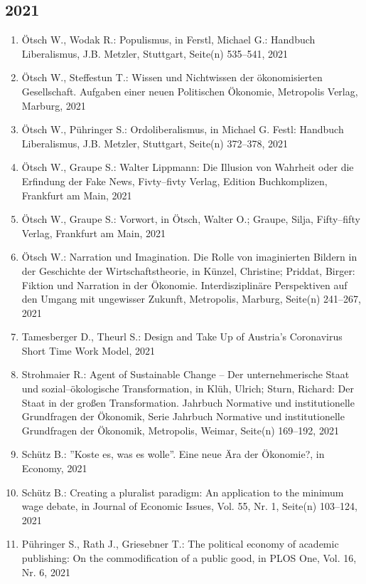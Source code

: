\subsection*{2021}
\begin{enumerate}
    	 \item Ötsch W., Wodak R.: Populismus, in Ferstl, Michael G.: Handbuch Liberalismus, J.B. Metzler, Stuttgart, Seite(n) 535--541, 2021
	 \item Ötsch W., Steffestun T.: Wissen und Nichtwissen der ökonomisierten Gesellschaft. Aufgaben einer neuen Politischen Ökonomie, Metropolis Verlag, Marburg, 2021
	 \item Ötsch W., Pühringer S.: Ordoliberalismus, in Michael G. Festl: Handbuch Liberalismus, J.B. Metzler, Stuttgart, Seite(n) 372--378, 2021
	 \item Ötsch W., Graupe S.: Walter Lippmann: Die Illusion von Wahrheit oder die Erfindung der Fake News, Fivty--fivty Verlag, Edition Buchkomplizen, Frankfurt am Main, 2021
	 \item Ötsch W., Graupe S.: Vorwort, in Ötsch, Walter O.; Graupe, Silja, Fifty--fifty Verlag, Frankfurt am Main, 2021
	 \item Ötsch W.: Narration und Imagination. Die Rolle von imaginierten Bildern in der Geschichte der Wirtschaftstheorie, in Künzel, Christine; Priddat, Birger: Fiktion und Narration in der Ökonomie. Interdisziplinäre Perspektiven auf den Umgang mit ungewisser Zukunft, Metropolis, Marburg, Seite(n) 241--267, 2021
	 \item Tamesberger D., Theurl S.: Design and Take Up of Austria’s Coronavirus Short Time Work Model, 2021
	 \item Strohmaier R.: Agent of Sustainable Change -- Der unternehmerische Staat und sozial--ökologische Transformation, in Klüh, Ulrich; Sturn, Richard: Der Staat in der großen Transformation. Jahrbuch Normative und institutionelle Grundfragen der Ökonomik, Serie Jahrbuch Normative und institutionelle Grundfragen der Ökonomik, Metropolis, Weimar, Seite(n) 169--192, 2021
	 \item Schütz B.: ''Koste es, was es wolle''. Eine neue Ära der Ökonomie?, in Economy, 2021
	 \item Schütz B.: Creating a pluralist paradigm: An application to the minimum wage debate, in Journal of Economic Issues, Vol. 55, Nr. 1, Seite(n) 103--124, 2021
	 \item Pühringer S., Rath J., Griesebner T.: The political economy of academic publishing: On the commodification of a public good, in PLOS One, Vol. 16, Nr. 6, 2021

\end{enumerate}
